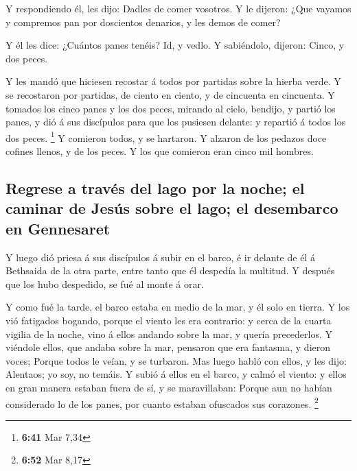 Y respondiendo él, les dijo: Dadles de comer vosotros. Y
le dijeron: ¿Que vayamos y compremos pan por doscientos denarios, y les
demos de comer?

 Y él les dice: ¿Cuántos panes tenéis? Id, y vedlo. Y
sabiéndolo, dijeron: Cinco, y dos peces.

 Y les mandó que hiciesen recostar á todos por partidas
sobre la hierba verde.  Y se recostaron por partidas, de
ciento en ciento, y de cincuenta en cincuenta.  Y tomados
los cinco panes y los dos peces, mirando al cielo, bendijo, y partió los
panes, y dió á sus discípulos para que los pusiesen delante: y repartió
á todos los dos peces. \footnote{\textbf{6:41} Mar 7,34} 
Y comieron todos, y se hartaron.  Y alzaron de los
pedazos doce cofines llenos, y de los peces.  Y los que
comieron eran cinco mil hombres.

\hypertarget{regrese-a-travuxe9s-del-lago-por-la-noche-el-caminar-de-jesuxfas-sobre-el-lago-el-desembarco-en-gennesaret}{%
\subsection{Regrese a través del lago por la noche; el caminar de Jesús
sobre el lago; el desembarco en
Gennesaret}\label{regrese-a-travuxe9s-del-lago-por-la-noche-el-caminar-de-jesuxfas-sobre-el-lago-el-desembarco-en-gennesaret}}

 Y luego dió priesa á sus discípulos á subir en el barco,
é ir delante de él á Bethsaida de la otra parte, entre tanto que él
despedía la multitud.  Y después que los hubo despedido,
se fué al monte á orar.

 Y como fué la tarde, el barco estaba en medio de la mar,
y él solo en tierra.  Y los vió fatigados bogando, porque
el viento les era contrario: y cerca de la cuarta vigilia de la noche,
vino á ellos andando sobre la mar, y quería precederlos. 
Y viéndole ellos, que andaba sobre la mar, pensaron que era fantasma, y
dieron voces;  Porque todos le veían, y se turbaron. Mas
luego habló con ellos, y les dijo: Alentaos; yo soy, no temáis.
 Y subió á ellos en el barco, y calmó el viento: y ellos
en gran manera estaban fuera de sí, y se maravillaban: 
Porque aun no habían considerado lo de los panes, por cuanto estaban
ofuscados sus corazones. \footnote{\textbf{6:52} Mar 8,17}

